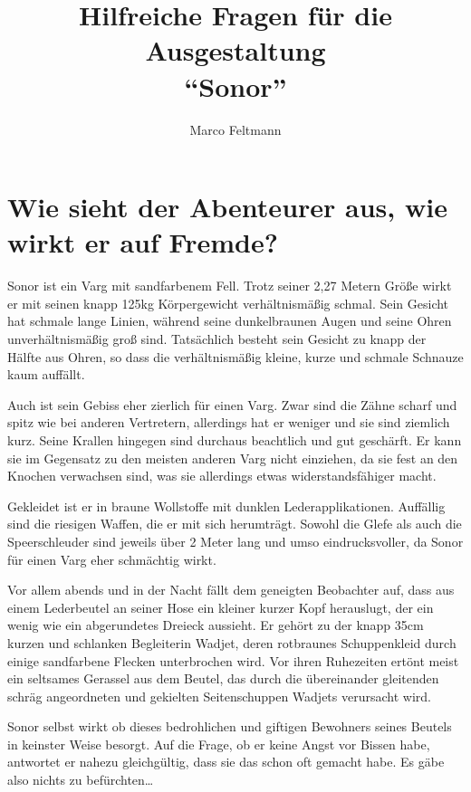 \documentclass{article}
\author{Marco Feltmann}
\title{Hilfreiche Fragen für die Ausgestaltung \\ \enquote{Sonor} }
\begin{document}
	\maketitle
	
	\tableofcontents
	
	\section[Aussehen]{Wie sieht der Abenteurer aus, wie wirkt er auf Fremde?}
	
	Sonor ist ein Varg mit sandfarbenem Fell. Trotz
	seiner 2,27 Metern Größe wirkt er mit seinen knapp 125kg Körpergewicht
	verhältnismäßig schmal. Sein Gesicht hat schmale lange Linien, während
	seine dunkelbraunen Augen und seine Ohren unverhältnismäßig groß sind.
	Tatsächlich besteht sein Gesicht zu knapp der Hälfte aus Ohren, so dass
	die verhältnismäßig kleine, kurze und schmale Schnauze kaum auffällt.

	Auch ist sein Gebiss eher zierlich für einen Varg. Zwar sind die Zähne
	scharf und spitz wie bei anderen Vertretern, allerdings hat er
	weniger und sie sind ziemlich kurz.
	Seine Krallen hingegen sind durchaus beachtlich und gut geschärft. Er
	kann sie im Gegensatz zu den meisten anderen Varg nicht einziehen, da
	sie fest an den Knochen verwachsen sind, was sie allerdings
	etwas widerstandsfähiger macht.

	Gekleidet ist er in braune Wollstoffe mit dunklen Lederapplikationen.
	Auffällig sind die riesigen Waffen, die er mit sich herumträgt. Sowohl
	die Glefe als auch die Speerschleuder sind jeweils über 2 Meter lang und
	umso eindrucksvoller, da Sonor für einen Varg eher schmächtig wirkt.

	Vor allem abends und in der Nacht fällt dem geneigten Beobachter auf,
	dass aus einem Lederbeutel an seiner Hose ein kleiner kurzer
	Kopf herauslugt, der ein wenig wie ein abgerundetes Dreieck aussieht.
	Er gehört zu der knapp 35cm kurzen und schlanken Begleiterin Wadjet,
	deren rotbraunes Schuppenkleid durch einige sandfarbene Flecken
	unterbrochen wird.
	Vor ihren Ruhezeiten ertönt meist ein seltsames Gerassel aus dem
	Beutel, das durch die übereinander gleitenden schräg angeordneten und
	gekielten Seitenschuppen Wadjets verursacht wird.

	Sonor selbst wirkt ob dieses bedrohlichen und giftigen Bewohners seines
	Beutels in keinster Weise besorgt. Auf die Frage, ob er keine Angst vor
	Bissen habe, antwortet er nahezu gleichgültig, dass sie das schon oft
	gemacht habe. Es gäbe also nichts zu befürchten\ldots
\end{document}
